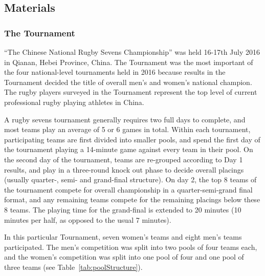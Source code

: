 \subsection{Materials}

\subsubsection{The Tournament}
``The Chinese National Rugby Sevens Championship'' was held 16-17th July 2016 in Qianan, Hebei Province, China. The Tournament was the most important of the four national-level tournaments held in 2016 because results in the Tournament decided the title of overall men's and women’s national champion. The rugby players surveyed in the Tournament represent the top level of current professional rugby playing athletes in China.

A rugby sevens tournament generally requires two full days to complete, and most teams play an average of 5 or 6 games in total. Within each tournament, participating teams are first divided into smaller pools, and spend the first day of the tournament playing a 14-minute game against every team in their pool. On the second day of the tournament, teams are re-grouped according to Day 1 results, and play in a three-round knock out phase to decide overall placings (usually quarter-, semi- and grand-final structure). On day 2, the top 8 teams of the tournament compete for overall championship in a quarter-semi-grand final format, and any remaining teams compete for the remaining placings below these 8 teams. The playing time for the grand-final is extended to 20 minutes (10 minutes per half, as opposed to the usual 7 minutes).

In this particular Tournament, seven women's teams and eight men's teams participated.  The men’s competition was split into two pools of four teams each, and the women’s competition was split into one pool of four and one pool of three teams (see Table~\ref{tab:poolStructure}). \\


